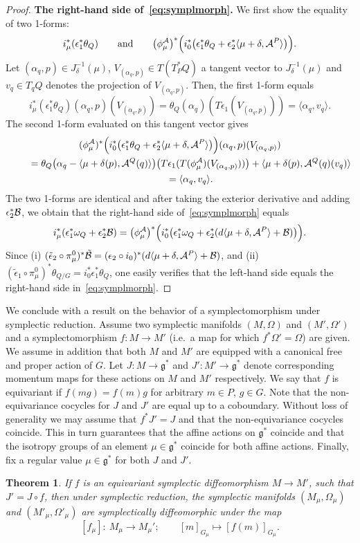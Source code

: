 \documentclass[11pt]{article}
\newtheorem{theorem}{Theorem}
\newcommand{\A}{{\cal A}}
\newcommand{\B}{{\cal B}}
\newcommand{\e}{\epsilon}
\newcommand{\lag}{\mathfrak{g}}
\begin{document}
\begin{proof}
{\bf The right-hand side of~\eqref{eq:symplmorph}.}
We f\/irst show the equality of two 1-forms:
\[
i^*_\mu(\e_1^*\theta_Q)\qquad \mbox{and} \qquad \big(\phi_\mu^\A\big)^*\Big(i^*_0\big(\e_1^*\theta_Q +\e_2^*\langle \mu+\delta,\A^P\rangle\big)\Big).
\] Let $(\alpha_q,p)\in J^{-1}_\delta(\mu)$, $V_{(\alpha_q,p)}\in T( T_P^*Q)$ a tangent vector to $J^{-1}_\delta(\mu)$ and $v_q\in T_qQ$ denotes the projection of $V_{(\alpha_q,p)}$. Then, the f\/irst 1-form equals
\[
i^*_\mu(\e_1^*\theta_Q)(\alpha_q,p)(V_{(\alpha_q,p)})= \theta_Q(\alpha_q)(T\e_1(V_{(\alpha_q,p)}))=\langle \alpha_q, v_q\rangle.
\]
The second 1-form evaluated on this tangent vector gives
\begin{gather*}
   (\phi_\mu^\A)^*\Big(i^*_0\big(\e_1^*\theta_Q +\e_2^*\langle\mu+\delta,\A^P\rangle\big)\Big)(\alpha_q,p)(V_{(\alpha_q,p)}) \\
    \qquad{}  = \theta_Q\big(\alpha_q-\langle\mu+\delta(p),\A^Q(q)\rangle\big)\big(T\e_1(T(\phi^\A_\mu)(V_{(\alpha_q,p)}))\big)  + \langle \mu+\delta(p),\A^Q(q)(v_q)\rangle\\
{} \qquad = \langle \alpha_q, v_q\rangle.
\end{gather*}
The two 1-forms are identical and after taking the exterior derivative and adding $\e^*_2\B$, we obtain that the right-hand side of~\eqref{eq:symplmorph} equals \[i^*_\mu(\e_1^*\omega_Q+\e^*_2\B) = \big(\phi_\mu^{\A}\big)^*\Big(i^*_0\big(\e_1^*\omega_Q +\e_2^*(d\langle \mu+\delta,\A^P\rangle+\B)\big)\Big).\]
Since (i) $(\tilde\e_2\circ\pi^0_\mu)^*\tilde\B = (\e_2\circ i_0)^*(d\langle \mu+\delta,\A^P\rangle+\B)$, and (ii) $(\tilde\e_1\circ\pi^0_\mu)^*\theta_{Q/G}=i_0^*\e_1^*\theta_{Q}$, one easily verif\/ies that the left-hand side equals the right-hand side in~\eqref{eq:symplmorph}.
\end{proof}

We conclude with a result on the behavior of a symplectomorphism under symplectic reduction. Assume two symplectic manifolds $(M,\Omega)$ and $(M',\Omega')$ and a symplectomorphism $f:M\to M'$ (i.e.\ a map for which $f^*\Omega'=\Omega$) are given. We assume in addition that both $M$ and $M'$ are equipped with a canonical free and proper action of $G$. Let $J:M\to \lag^*$ and $J':M'\to \lag^*$ denote corresponding momentum maps for these actions on $M$ and $M'$ respectively. We say that $f$ is equivariant if $f(mg)=f(m)g$ for arbitrary $m\in P$, $g\in G$. Note that the non-equivariance cocycles for $J$ and $J'$ are equal up to a coboundary. Without loss of generality we may assume that $f^*J'=J$ and that the non-equivariance cocycles coincide. This in turn guarantees that the af\/f\/ine actions on $\lag^*$ coincide and that the isotropy groups of an element $\mu\in\lag^*$ coincide for both af\/f\/ine actions. Finally, f\/ix  a regular value $\mu \in \lag^*$ for both $J$ and $J'$.
\begin{theorem}\label{thm:1}
  If $f$ is an equivariant symplectic diffeomorphism $M\to M'$, such that $J'=J \circ f$, then under symplectic reduction, the symplectic manifolds $(M_\mu,\Omega_\mu)$ and $(M'_\mu,\Omega'_\mu)$ are symplectically diffeomorphic under the map
  \[
  [f_\mu]:\ M_\mu\to M_\mu'; \qquad [m]_{G_\mu} \mapsto [f(m)]_{G_\mu}.
  \]
\end{theorem}
\end{document}
